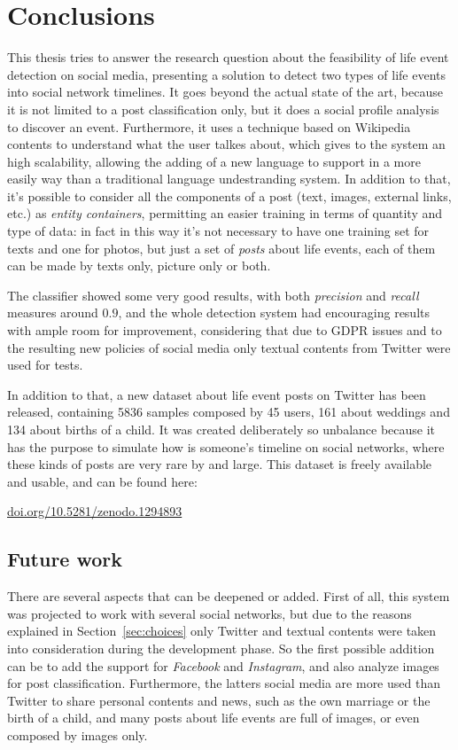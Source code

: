 \chapter{Conclusions}
\label{cha:conclusions}
This thesis tries to answer the research question about the feasibility of life event detection on social media, presenting a solution to detect two types of life events into social network timelines. It goes beyond the actual state of the art, because it is not limited to a post classification only, but it does a social profile analysis to discover an event. Furthermore, it uses a technique based on Wikipedia contents to understand what the user talkes about, which gives to the system an high scalability, allowing the adding of a new language to support in a more easily way than a traditional language undestranding system. In addition to that, it's possible to consider all the components of a post (text, images, external links, etc.) as \emph{entity containers}, permitting an easier training in terms of quantity and type of data: in fact in this way it's not necessary to have one training set for texts and one for photos, but just a set of \emph{posts} about life events, each of them can be made by texts only, picture only or both.

The classifier showed some very good results, with both \emph{precision} and \emph{recall} measures around $0.9$, and the whole detection system had encouraging results with ample room for improvement, considering that due to GDPR issues and to the resulting new policies of social media only textual contents from Twitter were used for tests.

In addition to that, a new dataset about life event posts on Twitter has been released, containing 5836 samples composed by 45 users, 161 about weddings and 134 about births of a child. It was created deliberately so unbalance because it has the purpose to simulate how is someone's timeline on social networks, where these kinds of posts are very rare by and large. This dataset is freely available and usable, and can be found here:
\begin{center}
\url{doi.org/10.5281/zenodo.1294893}
\end{center}

\section{Future work}
\label{sec:futurework}
There are several aspects that can be deepened or added. First of all, this system was projected to work with several social networks, but due to the reasons explained in Section~\ref{sec:choices} only Twitter and textual contents were taken into consideration during the development phase. So the first possible addition can be to add the support for \emph{Facebook} and \emph{Instagram}, and also analyze images for post classification. Furthermore, the latters social media are more used than Twitter to share personal contents and news, such as the own marriage or the birth of a child, and many posts about life events are full of images, or even composed by images only.

